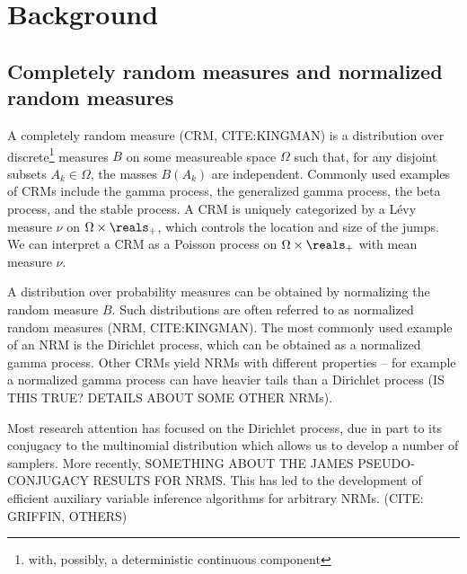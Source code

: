 \section{Background}
\subsection{Completely random measures and normalized random measures}
A completely random measure (CRM, CITE:KINGMAN) is a distribution over
discrete\footnote{with, possibly, a deterministic continuous component} measures
$B$ on some measureable space $\Omega$ such that, for any disjoint subsets
$A_k\in\Omega$, the masses $B(A_k)$ are independent. Commonly used examples of
CRMs include the gamma process, the generalized gamma process, the beta process,
and the stable process. A CRM is uniquely categorized by a L\'{e}vy measure
$\nu$ on $\Omega\times\reals_+$, which controls the location and size of the
jumps. We can interpret a CRM as a Poisson process on $\Omega\times\reals_+$
with mean measure $\nu$.

A distribution over probability measures can be obtained by normalizing the
random measure $B$. Such distributions are often referred to as normalized
random measures (NRM, CITE:KINGMAN). The most commonly used example of an NRM is
the Dirichlet process, which can be obtained as a normalized gamma process.
Other CRMs yield NRMs with different properties -- for example a normalized
gamma process can have heavier tails than a Dirichlet process (IS THIS TRUE?
DETAILS ABOUT SOME OTHER NRMs).

Most research attention has focused on the Dirichlet process, due in part to its
conjugacy to the multinomial distribution which allows us to develop a number of
samplers. More recently, SOMETHING ABOUT THE JAMES PSEUDO-CONJUGACY RESULTS FOR
NRMS. This has led to the development of efficient auxiliary variable inference
algorithms for arbitrary NRMs. (CITE: GRIFFIN, OTHERS)


